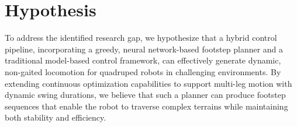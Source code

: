 \section{Hypothesis}
\label{sec:introduction-hypothesis}

To address the identified research gap, we hypothesize that a hybrid
control pipeline, incorporating a greedy, neural network-based
footstep planner and a traditional model-based control framework, can
effectively generate dynamic, non-gaited locomotion for quadruped
robots in challenging environments. By extending continuous optimization 
capabilities to support multi-leg motion with dynamic swing durations, 
we believe that such a planner can produce footstep sequences that 
enable the robot to traverse complex terrains while maintaining both 
stability and efficiency.
